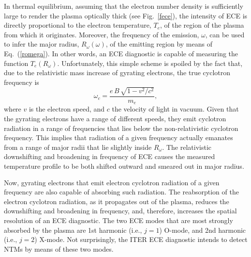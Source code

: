 \documentclass[12pt,prb,aps]{revtex4-1}
\begin{document}
In thermal equilibrium, assuming that the electron number density is sufficiently large to render the plasma optically thick (see Fig.~\ref{fece}), the intensity of ECE  is directly proportional to the electron temperature, $T_e$,  of the region of the plasma from which it originates.\cite{bornatici} 
 Moreover, the frequency of the emission, $\omega$, can be used to infer the major radius, $R_\omega(\omega)$,  of the
emitting region by means of Eq.~(\ref{romega}). In other words, an ECE diagnostic is capable of measuring the function $T_e(R_\omega)$. Unfortunately, this simple scheme is spoiled by the
fact that, due to the relativistic mass increase of gyrating electrons,  the true cyclotron frequency is
\begin{equation}
\omega_c = \frac{e\,B\,\sqrt{1-v^2/c^2}}{m_e},
\end{equation}
where $v$ is the electron speed, and $c$ the velocity of light in vacuum. Given that the gyrating electrons have a range of different speeds, they emit
cyclotron radiation in a range of frequencies that lies below the non-relativistic cyclotron frequency. This implies that radiation of a given frequency
actually emanates from a range of major radii that lie slightly inside $R_\omega$. The relativistic downshifting and broadening
in frequency of ECE  causes the measured temperature profile to be both shifted outward and smeared out in major radius. 

Now, gyrating electrons that emit electron cyclotron radiation of a given frequency are also capable of absorbing such radiation. 
 The reabsorption of the electron cyclotron radiation, as it propagates out of the plasma, reduces the  downshifting and broadening
in frequency, and, therefore, increases the spatial resolution of an ECE diagnostic. The two ECE modes that are most strongly
absorbed by the plasma are 1st harmonic (i.e., $j=1$) O-mode, and 2nd harmonic (i.e., $j=2$) X-mode.\cite{bornatici}
Not surprisingly, the ITER ECE diagnostic intends to detect NTMs by means of these two modes.\cite{ece4a,ece5}
\end{document}
